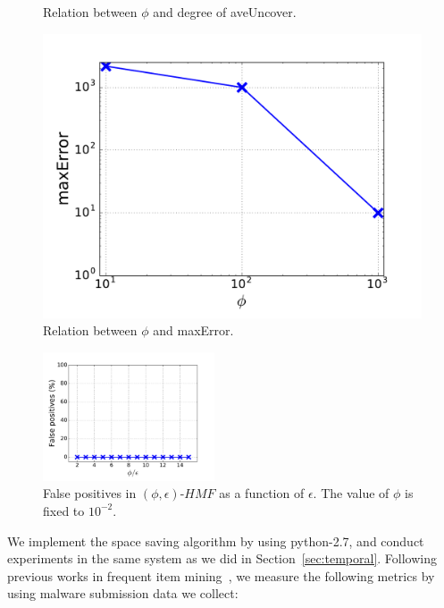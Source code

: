 \begin{figure}[!htb]
  \caption{Relation between $\phi$ and degree of aveUncover.}
  \label{fig:aveUncover}
\endminipage\hfill
{}%
  \includegraphics[width=\linewidth]{figure/maxError.pdf}
  \caption{Relation between $\phi$ and maxError.}
  \label{fig:maxError}

\endminipage
\end{figure}

\begin{figure}[t!]
\begin{center}
\includegraphics[width=2.0in]{figure/fp}
\caption{False positives in $(\phi, \epsilon)\mbox{-}HMF$ as a function of $\epsilon$. The value of $\phi$ is fixed to $10^{-2}$.}
\label{fig:fp}
\end{center}
\end{figure}





We implement the space saving algorithm by using python-2.7, 
and conduct experiments in the same system as we did in Section~\ref{sec:temporal}.
Following previous works in frequent item mining~\cite{hot-calling-context}, 
we measure the following metrics by using malware submission data we collect:

